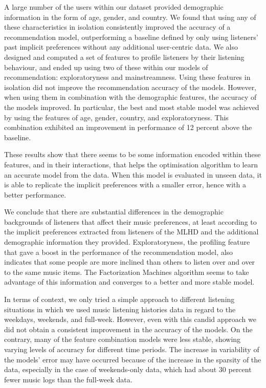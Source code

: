 A large number of the users within our dataset provided demographic information in the form of age, gender, and country. We found that using any of these characteristics in isolation consistently improved the accuracy of a recommendation model, outperforming a baseline defined by only using listeners' past implicit preferences without any additional user-centric data.
We also designed and computed a set of features to profile listeners by their listening behaviour, and ended up using two of these within our models of recommendation: exploratoryness and mainstreamness.
Using these features in isolation did not improve the recommendation accuracy of the models. However, when using them in combination with the demographic features, the accuracy of the models improved. 
In particular, the best and most stable model was achieved by using the features of age, gender, country, and exploratoryness. This combination exhibited an improvement in performance of 12 percent above the baseline. 

These results show that there seems to be some information encoded within these features, and in their interactions, that helps the optimisation algorithm to learn an accurate model from the data. When this model is evaluated in unseen data, it is able to replicate the implicit preferences with a smaller error, hence with a better performance.

We conclude that there are substantial differences in the demographic backgrounds of listeners that affect their music preferences, at least according to the implicit preferences extracted from listeners of the MLHD and the additional demographic information they provided. 
Exploratoryness, the profiling feature that gave a boost in the performance of the recommendation model, also indicates that some people are more inclined than others to listen over and over to the same music items. 
The Factorization Machines algorithm seems to take advantage of this information and converges to a better and more stable model.



In terms of context, we only tried a simple approach to different listening situations in which we used music listening histories data in regard to the weekdays, weekends, and full-week. 
However, even with this candid approach we did not obtain a consistent improvement in the accuracy of the models. 
On the contrary, many of the feature combination models were less stable, showing varying levels of accuracy for different time periods.
The increase in variability of the models' error may have occurred because of the increase in the sparsity of the data, especially in the case of weekends-only data, which had about 30 percent fewer music logs than the full-week data.



